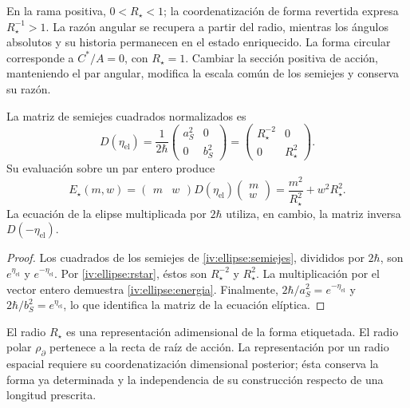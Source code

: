 En la rama positiva, \(0<R_\star<1\); la coordenatización de forma
revertida expresa \(R_\star^{-1}>1\). La razón angular
se recupera a partir del radio, mientras los ángulos absolutos
y su historia permanecen en el estado enriquecido.
La forma circular corresponde a \(C^*/A=0\), con
\(R_\star=1\). Cambiar la sección positiva de acción,
manteniendo el par angular, modifica la escala común de
los semiejes y conserva su razón.

\begin{proposition}
\label{iv:ellipse:matriz-prop}
La matriz de semiejes cuadrados normalizados es
\begin{equation}
 D(\eta_{\mathrm{el}})
 =\frac1{2\hbar}
    \begin{pmatrix}a_S^2&0\\0&b_S^2\end{pmatrix}
 =\begin{pmatrix}R_\star^{-2}&0\\0&R_\star^2\end{pmatrix}.
 \label{iv:ellipse:matriz}
\end{equation}
Su evaluación sobre un par entero produce
\begin{equation}
 E_\star(m,w)=
 \begin{pmatrix}m&w\end{pmatrix}
 D(\eta_{\mathrm{el}})
 \begin{pmatrix}m\\w\end{pmatrix}
 =\frac{m^2}{R_\star^2}+w^2R_\star^2.
 \label{iv:ellipse:energia}
\end{equation}
La ecuación de la elipse multiplicada por \(2\hbar\)
utiliza, en cambio, la matriz inversa \(D(-\eta_{\mathrm{el}})\).
\end{proposition}
\begin{proof}
Los cuadrados de los semiejes de
\eqref{iv:ellipse:semiejes}, divididos por \(2\hbar\),
son \(e^{\eta_{\mathrm{el}}}\) y
\(e^{-\eta_{\mathrm{el}}}\).
Por \eqref{iv:ellipse:rstar}, éstos son
\(R_\star^{-2}\) y \(R_\star^2\).
La multiplicación por el vector entero demuestra
\eqref{iv:ellipse:energia}. Finalmente,
\(2\hbar/a_S^2=e^{-\eta_{\mathrm{el}}}\) y
\(2\hbar/b_S^2=e^{\eta_{\mathrm{el}}}\), lo que
identifica la matriz de la ecuación elíptica.
\end{proof}

El radio \(R_\star\) es una representación adimensional de
la forma etiquetada. El radio polar
\(\rho_{\partial}\) pertenece a la recta de raíz de acción.
La representación por un radio espacial requiere su coordenatización
dimensional posterior; ésta conserva la forma ya determinada
y la independencia de su construcción respecto de una
longitud prescrita.
